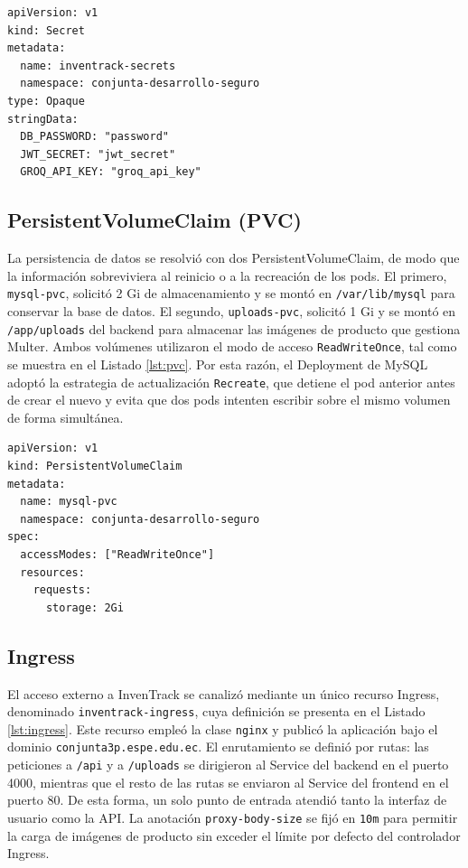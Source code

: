 \documentclass[stu,11pt,spanish,floatsintext]{apa7}
\begin{document}
\begin{lstlisting}[caption={Secret con credenciales (01-secrets.yaml)},label=lst:secret]
apiVersion: v1
kind: Secret
metadata:
  name: inventrack-secrets
  namespace: conjunta-desarrollo-seguro
type: Opaque
stringData:
  DB_PASSWORD: "password"
  JWT_SECRET: "jwt_secret"
  GROQ_API_KEY: "groq_api_key"
\end{lstlisting}

\subsection{PersistentVolumeClaim (PVC)}

La persistencia de datos se resolvió con dos PersistentVolumeClaim, de modo que la información sobreviviera al reinicio o a la recreación de los pods. El primero, \texttt{mysql-pvc}, solicitó 2 Gi de almacenamiento y se montó en \texttt{/var/lib/mysql} para conservar la base de datos. El segundo, \texttt{uploads-pvc}, solicitó 1 Gi y se montó en \texttt{/app/uploads} del backend para almacenar las imágenes de producto que gestiona Multer. Ambos volúmenes utilizaron el modo de acceso \texttt{ReadWriteOnce}, tal como se muestra en el Listado \ref{lst:pvc}. Por esta razón, el Deployment de MySQL adoptó la estrategia de actualización \texttt{Recreate}, que detiene el pod anterior antes de crear el nuevo y evita que dos pods intenten escribir sobre el mismo volumen de forma simultánea.

\begin{lstlisting}[caption={PersistentVolumeClaim de la base de datos (03-mysql.yaml)},label=lst:pvc]
apiVersion: v1
kind: PersistentVolumeClaim
metadata:
  name: mysql-pvc
  namespace: conjunta-desarrollo-seguro
spec:
  accessModes: ["ReadWriteOnce"]
  resources:
    requests:
      storage: 2Gi
\end{lstlisting}

\subsection{Ingress}

El acceso externo a InvenTrack se canalizó mediante un único recurso Ingress, denominado \texttt{inventrack-ingress}, cuya definición se presenta en el Listado \ref{lst:ingress}. Este recurso empleó la clase \texttt{nginx} y publicó la aplicación bajo el dominio \texttt{conjunta3p.espe.edu.ec}. El enrutamiento se definió por rutas: las peticiones a \texttt{/api} y a \texttt{/uploads} se dirigieron al Service del backend en el puerto 4000, mientras que el resto de las rutas se enviaron al Service del frontend en el puerto 80. De esta forma, un solo punto de entrada atendió tanto la interfaz de usuario como la API. La anotación \texttt{proxy-body-size} se fijó en \texttt{10m} para permitir la carga de imágenes de producto sin exceder el límite por defecto del controlador Ingress.
\end{document}
